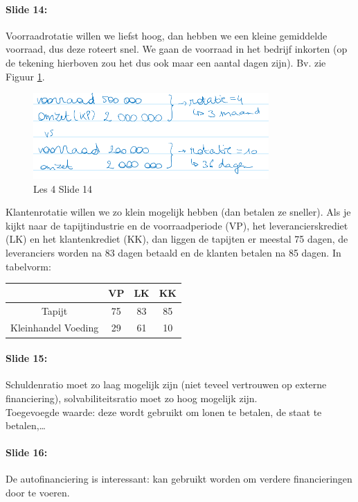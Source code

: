 \documentclass[10pt,a4paper]{report}
\begin{document}
\paragraph{Slide 14:} Voorraadrotatie willen we liefst hoog, dan hebben we een kleine gemiddelde voorraad, dus deze roteert snel. We gaan de voorraad in het bedrijf inkorten (op de tekening hierboven zou het dus ook maar een aantal dagen zijn). Bv. zie Figuur \ref{les04_02}.

\begin{figure}[h!]
\centering
\includegraphics[width=90mm]{Les04_02.png}
\caption{Les 4 Slide 14} 
\label{les04_02}
\end{figure}

Klantenrotatie willen we zo klein mogelijk hebben (dan betalen ze sneller). 
Als je kijkt naar de tapijtindustrie en de voorraadperiode (VP),  het leverancierskrediet (LK) en het klantenkrediet (KK), dan liggen de tapijten er meestal 75 dagen, de leveranciers worden na 83 dagen betaald en de klanten betalen na 85 dagen. In tabelvorm:


\begin{table}[h!]
\centering
\begin{tabular}{|c||c|c|c|}
\hline                         										
		 				&	VP 		&	LK		&	KK		\\	\hline	\hline
Tapijt					&	75		&	83		&	85		\\	\hline
Kleinhandel Voeding		&	29		&	61		&	10		\\	\hline

\end{tabular}
\label{les4_slide14}
\end{table}

\paragraph{Slide 15:} Schuldenratio moet zo laag mogelijk zijn (niet teveel vertrouwen op externe financiering), solvabiliteitsratio moet zo hoog mogelijk zijn.\\
Toegevoegde waarde: deze wordt gebruikt om lonen te betalen, de staat te betalen,…

\paragraph{Slide 16:} De autofinanciering is interessant: kan gebruikt worden om verdere financieringen door te voeren.
\end{document}
